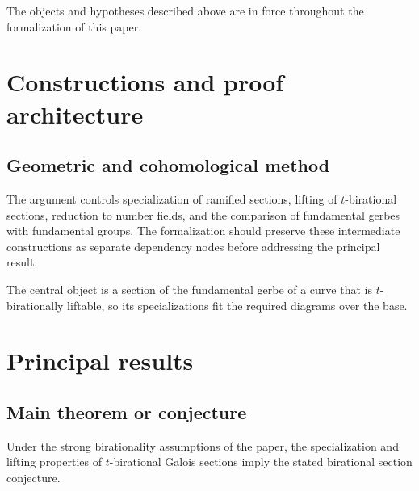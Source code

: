 \begin{convention}
\label{birational-section-conjecture-strong-birationality-setup}
The objects and hypotheses described above are in force throughout the
formalization of this paper.
\notready
\end{convention}

\chapter{Constructions and proof architecture}
\label{chap:birational-section-conjecture-strong-birationality-method}

\section{Geometric and cohomological method}
\label{sec:birational-section-conjecture-strong-birationality-method}

The argument controls specialization of ramified sections, lifting of $t$-birational sections, reduction to number fields, and the comparison of fundamental gerbes with fundamental groups. The formalization should preserve these intermediate constructions
as separate dependency nodes before addressing the principal result.

\begin{definition}
\label{birational-section-conjecture-strong-birationality-central-object}
The central object is a section of the fundamental gerbe of a curve that is $t$-birationally liftable, so its specializations fit the required diagrams over the base.
\notready
\end{definition}

\chapter{Principal results}
\label{chap:birational-section-conjecture-strong-birationality-results}

\section{Main theorem or conjecture}
\label{sec:birational-section-conjecture-strong-birationality-results}

\begin{theorem}
\label{birational-section-conjecture-strong-birationality-main}
Under the strong birationality assumptions of the paper, the specialization and lifting properties of $t$-birational Galois sections imply the stated birational section conjecture.
\notready
\end{theorem}

